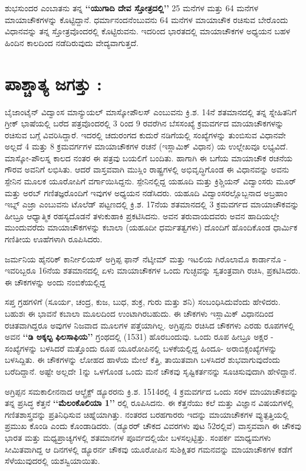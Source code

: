 ಶುಭಸುಂದರ ಎಂಬಾತನು ತನ್ನ \textbf{‘‘ಯುಗಾದಿ ದೇವ ಸ್ತೋತ್ರದಲ್ಲಿ’’} 25 ಮನೆಗಳ ಮತ್ತು 64 ಮನೆಗಳ ಮಾಯಾಚೌಕಗಳನ್ನು ಕೊಟ್ಟಿದ್ದಾನೆ. ಧರ್ಮಾನಂದನೆಂಬುವನು 64 ಮನೆಗಳ ಮಾಯಾಚೌಕ ರಚಿಸುವ ಬೇರೊಂದು ವಿಧಾನವನ್ನು ತನ್ನ ಸ್ತೋತ್ರವೊಂದರಲ್ಲಿ ಕೊಟ್ಟಿರುವನು. ಇದರಿಂದ ಭಾರತದಲ್ಲಿ ಮಾಯಾಚೌಕಗಳ ಅಧ್ಯಯನ ಬಹಳ ಹಿಂದಿನ ಕಾಲದಿಂದ ನಡೆದಿರುವುದು ವೇದ್ಯವಾಗುತ್ತದೆ.

\section*{ಪಾಶ್ಚಾತ್ಯ ಜಗತ್ತು :}

ಬೈಜಾಂಟೈನ್ ವಿದ್ವಾಂಸ ಮಾನ್ಯುಯಲ್ ಮಾಸ್ಕೋಪೌಲಸ್ ಎಂಬುವನು ಕ್ರಿ.ಶ. 14ನೆ ಶತಮಾನದಲ್ಲಿ ತನ್ನ ಸ್ನೇಹಿತನಿಗೆ ಗ್ರೀಕ್ ಭಾಷೆಯಲ್ಲಿ ಬರೆದ ಪತ್ರವೊಂದರಲ್ಲಿ 3 ರಿಂದ 9 ರವರೆಗಿನ ಬೆಸಸಂಖ್ಯೆ ಕ್ರಮವರ್ಗದ ಮಾಯಾಚೌಕಗಳನ್ನು ರಚಿಸುವ ಬಗ್ಗೆ ವಿವರಿಸಿದ್ದಾರೆ. ಇದರಲ್ಲಿ ಚದುರಂಗದ ಕುದುರೆ ನಡಿಗೆಯಲ್ಲಿ ಸಂಖ್ಯೆಗಳನ್ನು ತುಂಬಿಸುವ ವಿಧಾನವೇ ಅಲ್ಲದೆ 4 ಮತ್ತು 8 ಕ್ರಮವರ್ಗಗಳ ಮಾಯಾಚೌಕಗಳ ರಚನೆ (ಇಸ್ಲಾಮಿಕ್ ವಿಧಾನ) ಯ ಉಲ್ಲೇಖವೂ ಲಭ್ಯವಿದೆ. ಮಾಸ್ಕೋ-ಪೌಲಸ್ನ ಕಾಲದ ನಂತರ ಈ ಪತ್ರವು ಬಯಲಿಗೆ ಬಂದಿತು. ಹಾಗಾಗಿ ಈ ಬಗೆಯ ಮಾಯಾಚೌಕ ರಚನೆಯ ಗೌರವ ಅವನಿಗೆ ಲಭಿಸಿತು. ಆದರೆ ವಾಸ್ತವವಾಗಿ ಮುಸ್ಲಿಂ ರಾಷ್ಟ್ರಗಳಲ್ಲಿ ಅಭಿವೃದ್ಧಿಗೊಂಡ ಈ ವಿಧಾನವನ್ನು ಅವನು ಸ್ಪೇನಿನ ಮೂಲಕ ಯೂರೋಪಿಗೆ ವರ್ಗಾಯಿಸಿದ್ದನು. ಸ್ಪೇನಿನಲ್ಲಿದ್ದ ಯಹೂದಿ ಮತ್ತು ಕ್ರಿಶ್ಚಿಯನ್ ವಿದ್ವಾಂಸರು ಮೂರ್ ಮತ್ತು ಅರಬ್ ಗಣಿತಜ್ಞರೊಂದಿಗೆ ಇವುಗಳ ಅಧ್ಯಯನ ನಡೆಸಿದರು. ಯಹೂದಿ ವಿದ್ವಾಂಸರಲ್ಲೊಬ್ಬನಾದ ಅಬ್ರಹಾಂ ಇಬ್ನ್ ಎಜ್ರಾ ಎಂಬುವನು ಟೊಲೆಡ್ ಪಟ್ಟಣದಲ್ಲಿ ಕ್ರಿ.ಶ. 17ನೆಯ ಶತಮಾನದಲ್ಲಿ 3 ಕ್ರಮವರ್ಗದ ಮಾಯಾಚೌಕವನ್ನು ಹೀಬ್ರೂ ಆಧ್ಯಾತ್ಮಿಕ ರಹಸ್ಯದೊಡನೆ ತಳುಕುಹಾಕಿ ಪ್ರಕಟಿಸಿದನು. ಅವನ ತರುವಾಯದವರು ಅವನ ಹಾದಿಯಲ್ಲೇ ಮುಂದುವರೆದು ಮಾಯಾಚೌಕಗಳನ್ನು ಕಬಾಲಾ (ಯಹೂದೀ ಧರ್ಮತತ್ವಗಳು) ದೊಂದಿಗೆ ಹೊಂದಿಕೊಂಡ ಧಾರ್ಮಿಕ ಗಣಿತೀಯ ಊಹೆಗಳಾಗಿ ರೂಪಿಸಿದರು.

ಜರ್ಮನಿಯ ಹೈನರಿಕ್ ಕಾರ್ನೀಲಿಯಸ್ ಅಗ್ರಿಪ್ಪ ಫಾನ್ ನೆಟ್ಶೀಮ್​ ಮತ್ತು ಇಟಲಿಯ ಗಿರೊಲಾಮೊ ಕಾರ್ಡಾನೊ - ಇವರಿಬ್ಬರೂ 16ನೆಯ ಶತಮಾನದಲ್ಲಿ ಏಳು ಮಾಯಾಚೌಕಗಳ ಒಂದು ಗುಚ್ಛವನ್ನು ಸ್ವತಂತ್ರವಾಗಿ ರಚಿಸಿ, ಪ್ರಕಟಿಸಿದರು. ಈ ಚೌಕಗಳನ್ನು ಅಂದು ನಂಬಿಕೆಯಲ್ಲಿದ್ದ 

ಸಪ್ತ ಗ್ರಹಗಳಿಗೆ (ಸೂರ್ಯ, ಚಂದ್ರ, ಕುಜ, ಬುಧ, ಶುಕ್ರ, ಗುರು ಮತ್ತು ಶನಿ) ಸಂಬಂಧಿಸಿದುವೆಂದು ಹೇಳಿದರು. ಬಹುಶಃ ಈ ಭಾವನೆ ಕಬಾಲಾ ಮೂಲದಿಂದ ಉಂಟಾಗಿರಬಹುದು. ಈ ಚೌಕಗಳು ಇಸ್ಲಾಮಿಕ್ ವಿಧಾನದಿಂದ ರಚಿತವಾಗಿದ್ದರೂ ಅವುಗಳ ನಿಜವಾದ ಮೂಲಗಳ ಪತ್ತೆಯಾಗಿಲ್ಲ. ಅಗ್ರಿಪ್ಪನು ರಚಿಸಿದ ಚೌಕಗಳು ಎರಡು ರೂಪಗಳಲ್ಲಿ ಅವನ \textbf{‘‘ಡಿ ಅಕ್ಕಲ್ಟ ಫಿಲಸಾಫಿಯ’’} ಗ್ರಂಥದಲ್ಲಿ (1531) ಹೊರಬಂದುವು. ಒಂದು ರೂಪ ಹೀಬ್ರೂ ಅಕ್ಷರ - ಸಂಖ್ಯೆಗಳನ್ನು ಬಳಸಿದರೆ ಮತ್ತೊಂದು ರೂಪ ಯೂರೋಪಿನಲ್ಲಿ ಬಳಕೆಯಲ್ಲಿದ್ದ ಹಿಂದೂ- ಅರಾಬಿಕ್ಸಂಖ್ಯೆಗಳನ್ನು ಬಳಸಿದ್ದಿತು. ಈ ಚೌಕಗಳನ್ನು ಲೋಹದ ಹಾಳೆಯ ಮೇಲೆ ಕೆತ್ತಿ, ತಾಯಿತವಾಗಿ ಬಳಸಿದರೆ ಶುಭವಾಗುವುದೆಂದು ಬರೆದಿದ್ದಾನೆ. ಅಷ್ಟೇ ಅಲ್ಲದೇ 1ನ್ನು ಒಳಗೊಂಡ ಒಂದು ಮನೆ ಚೌಕವು ಸೃಷ್ಟಿಕರ್ತನನ್ನು ಸೂಚಿಸುವುದಾಗಿ ಹೇಳಿದ್ದಾನೆ.

ಅಗ್ರಿಪ್ಪನ ಸಮಕಾಲೀನನಾದ ಆಲ್ಬ್ರೆಕ್ಟ್ ಡ್ಯೂರರನು ಕ್ರಿ.ಶ. 1514ರಲ್ಲಿ 4 ಕ್ರಮವರ್ಗದ ಒಂದು ಸರಳ ಮಾಯಾಚೌಕವನ್ನು ತನ್ನ ಪ್ರಸಿದ್ಧ ಕೆತ್ತನೆ \textbf{‘‘ಮೆಲಂಕೊಲಿಯಾ 1’’} ರಲ್ಲಿ ರೂಪಿಸಿದನು. ಈ ಕೆತ್ತನೆಯು ಕಲೆ ಮತ್ತು ವಿಜ್ಞಾನ ವಿಷಯಗಳಲ್ಲಿ ಗಣಿತಶಾಸ್ತ್ರವನ್ನು ಪ್ರತಿನಿಧಿಸುವ ಚಿಹ್ನೆಯಾಗಿತ್ತು. ನಂತರದ ಬರಹಗಾರರು ಇದನ್ನು ಮಾಯಾಚೌಕಗಳ ವ್ಯುತ್ಪತ್ತಿಯಲ್ಲಿ ಪ್ರಮುಖ ಕೊಂಡಿ ಎಂದು ಕೊಂಡಾಡಿದರು. (ಡ್ಯೂರರ್ ಚೌಕದ ವಿವರಗಳು ಪುಟ 52ರಲ್ಲಿವೆ) ವಾಸ್ತವವಾಗಿ ಈ ಚೌಕವು ಭಾರತ ಮತ್ತು ಮಧ್ಯಪ್ರಾಚ್ಯಗಳಲ್ಲಿ ಶತಮಾನಗಳ ಪೂರ್ವದಲ್ಲಿಯೇ ಬಳಸಲ್ಪಟ್ಟಿತ್ತು. ಸಂಪರ್ಕ ಮಾಧ್ಯಮಗಳು ಸೀಮಿತವಾಗಿದ್ದ ಆ ದಿನಗಳಲ್ಲಿ ಡ್ಯೂರರ್ನ ಚೌಕವು ಯೂರೋಪಿನ ಸುಶಿಕ್ಷಿತರ ಗಮನವನ್ನು ಮಾಯಾಚೌಕಗಳ ಕಡೆಗೆ ಸೆಳೆಯುವುದರಲ್ಲಿ ಯಶಸ್ವಿಯಾಯಿತು.

